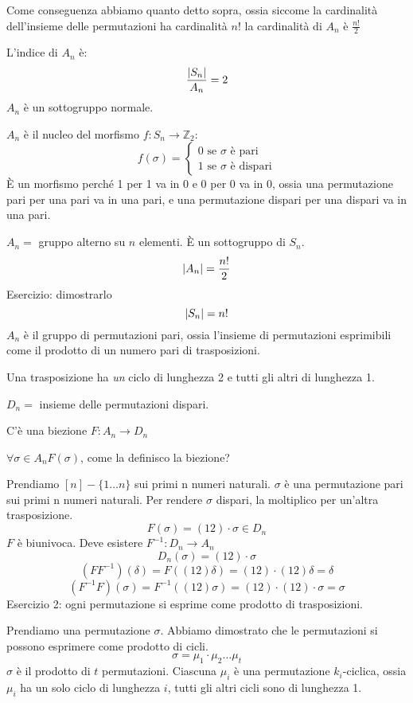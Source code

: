 Come conseguenza abbiamo quanto detto sopra, ossia siccome la cardinalit\`a dell'insieme delle permutazioni ha cardinalit\`a $n!$ la cardinalit\`a di $A_n$ \`e $\frac{n!}{2}$

L'indice di $A_n$ \`e:
\[
\frac{\left\lvert{S_n}\right\rvert}{A_n} = 2
\]
$A_n$ \`e un sottogruppo normale.

$A_n$ \`e il nucleo del morfismo $f : S_n \to \mathbb{Z}_2$:
\[
f (\sigma) = 
\begin{cases}
0 \text{ se } \sigma \text{ \`e pari} \\
1 \text{ se } \sigma \text{ \`e dispari} 
\end{cases}
\]
\`E un morfismo perch\'e 1 per 1 va in 0 e 0 per 0 va in 0, ossia una permutazione pari per una pari va in una pari, e una permutazione dispari per una dispari va in una pari.

$A_n =$ gruppo alterno su $n$ elementi. \`E un sottogruppo di $S_n$.
\[
\left\lvert{A_n}\right\rvert = \frac{n!}{2}
\]
Esercizio: dimostrarlo
\[
\left\lvert{S_n}\right\rvert = n!
\]
$A_n$ \`e il gruppo di permutazioni pari, ossia l'insieme di permutazioni esprimibili come il prodotto di un numero pari di trasposizioni.

Una trasposizione ha \textit{un} ciclo di lunghezza 2 e tutti gli altri di lunghezza 1.

$D_n =$ insieme delle permutazioni dispari.

C'\`e una biezione $F : A_n \to D_n$

$\forall \sigma \in A_n F(\sigma)$, come la definisco la biezione?

Prendiamo $[n] - \{ 1 \dots n \}$ sui primi n numeri naturali. $\sigma$ \`e una permutazione pari sui primi n numeri naturali. Per rendere $\sigma$ dispari, la moltiplico per un'altra trasposizione.
\[
F(\sigma) = (1 2) \cdot \sigma \in D_n
\]
$F$ \`e biunivoca. Deve esistere $F^{-1} : D_n \to A_n$
\[
D_n(\sigma) = (1 2) \cdot \sigma
\]
\[
(F F^{-1}) (\delta) = F((1 2) \delta) = (1 2) \cdot (1 2) \delta = \delta
\]
\[
(F^{-1} F) (\sigma) = F^{-1}((1 2) \sigma) = (1 2) \cdot (1 2) \cdot \sigma = \sigma
\]
Esercizio 2: ogni permutazione si esprime come prodotto di trasposizioni.

Prendiamo una permutazione $\sigma$. Abbiamo dimostrato che le permutazioni si possono esprimere come prodotto di cicli.
\[
\sigma = \mu_1 \cdot \mu_2 \dots \mu_t
\]
$\sigma$ \`e il prodotto di $t$ permutazioni. Ciascuna $\mu_i$ \`e una permutazione $k_i$-ciclica, ossia $\mu_i$ ha un solo ciclo di lunghezza $i$, tutti gli altri cicli sono di lunghezza 1.

